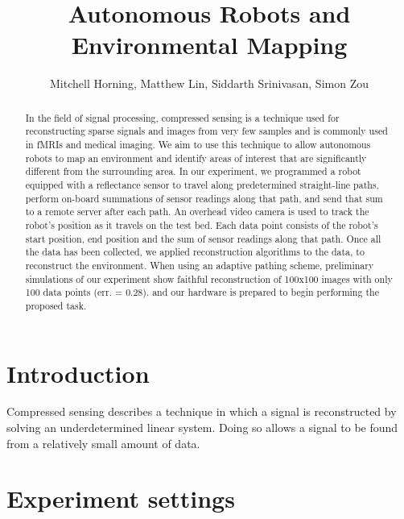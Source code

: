 \documentclass[english]{article}\usepackage[]{graphicx}\usepackage[]{color}
\begin{document}
\title{Autonomous Robots and Environmental Mapping}

\author{Mitchell Horning, Matthew Lin, Siddarth Srinivasan, Simon Zou}

\maketitle

\begin{abstract}

In the field of signal processing, compressed sensing is a technique used for 
reconstructing sparse signals and images from very few samples and is commonly 
used in fMRIs and medical imaging. We aim to use this technique to allow 
autonomous robots to map an environment and identify areas of interest that 
are significantly different from the surrounding area. In our experiment, we 
programmed a robot equipped with a reflectance sensor to travel along predetermined
straight-line paths, perform on-board summations of sensor readings along that path, and send that sum to a remote server after each path. An overhead video camera is used to track
the robot's position as it travels on the test bed. Each data point consists of
the robot's start position, end position and the sum of sensor readings along
that path. Once all the data has been collected, we applied reconstruction algorithms to the data, to reconstruct the environment. When using an adaptive pathing scheme, preliminary simulations of our experiment show faithful reconstruction of 100x100 images with only 100 data points (err. = 0.28). and our hardware is prepared to begin 
performing the proposed task.

\end{abstract}

\tableofcontents

\section{Introduction}

\begin{comment}
Discuss Compressed Sensing

\end{comment}

Compressed sensing describes a technique in which a signal is reconstructed by 
solving an underdetermined linear system. Doing so allows a signal to be 
found from a relatively small amount of data.

\section{Experiment settings}
\end{document}

